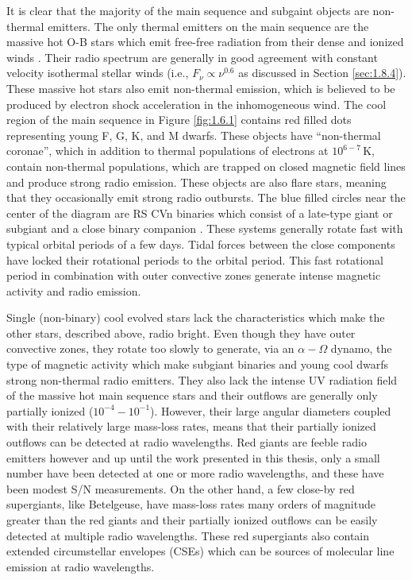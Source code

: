 It is clear that the majority of the main sequence and subgaint objects are non-thermal emitters. The only thermal emitters on the main sequence are the massive hot O-B stars which emit free-free radiation from their dense and ionized winds \cite[e.g.,][]{scuderi_1998}. Their radio spectrum are generally in good agreement with constant velocity isothermal stellar winds (i.e., $F_{\nu} \propto \nu ^{0.6}$ as discussed in Section \ref{sec:1.8.4}). These massive hot stars also emit non-thermal emission, which is believed to be produced by electron shock acceleration in the inhomogeneous wind. The cool region of the main sequence in Figure \ref{fig:1.6.1} contains red filled dots representing young F, G, K, and M dwarfs. These objects have ``non-thermal coronae'', which in addition to thermal populations of electrons at $10^{6-7}$\,K, contain non-thermal populations, which are trapped on closed magnetic field lines and produce strong radio emission. These objects are also flare stars, meaning that they occasionally emit strong radio outbursts. The blue filled circles near the center of the diagram are RS CVn binaries which consist of a late-type giant or subgiant and a close binary companion \citep{strassmeier_1993}. These systems generally rotate fast with typical orbital periods of a few days. Tidal forces between the close components have locked  their rotational periods to the orbital period. This fast rotational period in combination with outer convective zones generate intense magnetic activity and radio emission. 

Single (non-binary) cool evolved stars lack the characteristics which make the other stars, described above, radio bright. Even though they have outer convective zones, they rotate too slowly to generate, via an $\alpha - \Omega$ dynamo, the type of magnetic activity which make subgiant binaries and young cool dwarfs strong non-thermal radio emitters. They also lack the intense UV radiation field of the massive hot main sequence stars and their outflows are generally only partially ionized ($10^{-4} - 10^{-1}$). However, their large angular diameters coupled with their relatively large mass-loss rates, means that their partially ionized outflows can be detected at radio wavelengths. Red giants are feeble radio emitters however and up until the work presented in this thesis, only a small number have been detected at one or more radio wavelengths, and these have been modest S/N measurements. On the other hand, a few close-by red supergiants, like Betelgeuse, have mass-loss rates many orders of magnitude greater than the red giants and their partially ionized outflows can be easily detected at multiple radio wavelengths. These red supergiants also contain extended circumstellar envelopes (CSEs) which can be  sources of molecular line emission at radio wavelengths. 


